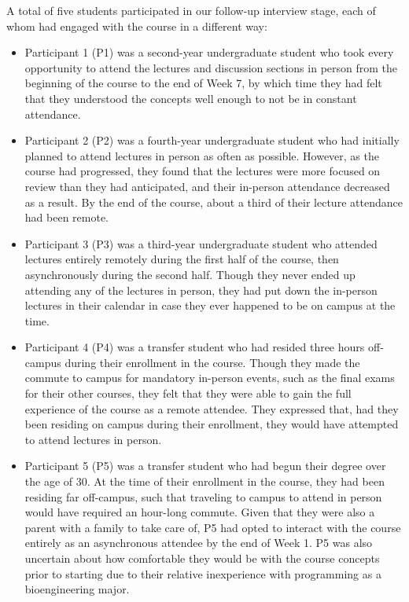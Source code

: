 A total of five students participated in our follow-up interview stage, each of whom had engaged with the course in a different way:
\begin{itemize}
    \item Participant 1 (P1) was a second-year undergraduate student who took every opportunity to attend the lectures and discussion sections in person from the beginning of the course to the end of Week 7, by which time they had felt that they understood the concepts well enough to not be in constant attendance.
    \item Participant 2 (P2) was a fourth-year undergraduate student who had initially planned to attend lectures in person as often as possible. However, as the course had progressed, they found that the lectures were more focused on review than they had anticipated, and their in-person attendance decreased as a result. By the end of the course, about a third of their lecture attendance had been remote.
    \item Participant 3 (P3) was a third-year undergraduate student who attended lectures entirely remotely during the first half of the course, then asynchronously during the second half. Though they never ended up attending any of the lectures in person, they had put down the in-person lectures in their calendar in case they ever happened to be on campus at the time.
    \item Participant 4 (P4) was a transfer student who had resided three hours off-campus during their enrollment in the course. Though they made the commute to campus for mandatory in-person events, such as the final exams for their other courses, they felt that they were able to gain the full experience of the course as a remote attendee. They expressed that, had they been residing on campus during their enrollment, they would have attempted to attend lectures in person.
    \item Participant 5 (P5) was a transfer student who had begun their degree over the age of 30. At the time of their enrollment in the course, they had been residing far off-campus, such that traveling to campus to attend in person would have required an hour-long commute. Given that they were also a parent with a family to take care of, P5 had opted to interact with the course entirely as an asynchronous attendee by the end of Week 1. P5 was also uncertain about how comfortable they would be with the course concepts prior to starting due to their relative inexperience with programming as a bioengineering major.
\end{itemize}

